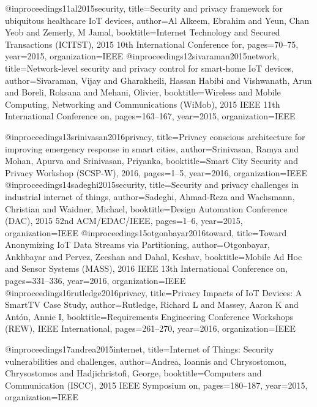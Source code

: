 {{@inproceedings{11al2015security,
	title={Security and privacy framework for ubiquitous healthcare {I}o{T} devices},
	author={Al Alkeem, Ebrahim and Yeun, Chan Yeob and Zemerly, M Jamal},
	booktitle={Internet Technology and Secured Transactions (ICITST), 2015 10th International Conference for},
	pages={70--75},
	year={2015},
	organization={IEEE}
}
@inproceedings{12sivaraman2015network,
	title={Network-level security and privacy control for smart-home {I}o{T} devices},
	author={Sivaraman, Vijay and Gharakheili, Hassan Habibi and Vishwanath, Arun and Boreli, Roksana and Mehani, Olivier},
	booktitle={Wireless and Mobile Computing, Networking and Communications (WiMob), 2015 IEEE 11th International Conference on},
	pages={163--167},
	year={2015},
	organization={IEEE}
}

@inproceedings{13srinivasan2016privacy,
	title={Privacy conscious architecture for improving emergency response in smart cities},
	author={Srinivasan, Ramya and Mohan, Apurva and Srinivasan, Priyanka},
	booktitle={Smart City Security and Privacy Workshop (SCSP-W), 2016},
	pages={1--5},
	year={2016},
	organization={IEEE}
}
@inproceedings{14sadeghi2015security,
	title={Security and privacy challenges in industrial internet of things},
	author={Sadeghi, Ahmad-Reza and Wachsmann, Christian and Waidner, Michael},
	booktitle={Design Automation Conference (DAC), 2015 52nd ACM/EDAC/IEEE},
	pages={1--6},
	year={2015},
	organization={IEEE}
}
@inproceedings{15otgonbayar2016toward,
	title={Toward Anonymizing {I}o{T} Data Streams via Partitioning},
	author={Otgonbayar, Ankhbayar and Pervez, Zeeshan and Dahal, Keshav},
	booktitle={Mobile Ad Hoc and Sensor Systems (MASS), 2016 IEEE 13th International Conference on},
	pages={331--336},
	year={2016},
	organization={IEEE}
}
@inproceedings{16rutledge2016privacy,
	title={Privacy Impacts of {I}o{T} Devices: A SmartTV Case Study},
	author={Rutledge, Richard L and Massey, Aaron K and Ant{\'o}n, Annie I},
	booktitle={Requirements Engineering Conference Workshops (REW), IEEE International},
	pages={261--270},
	year={2016},
	organization={IEEE}
}

@inproceedings{17andrea2015internet,
	title={Internet of Things: Security vulnerabilities and challenges},
	author={Andrea, Ioannis and Chrysostomou, Chrysostomos and Hadjichristofi, George},
	booktitle={Computers and Communication (ISCC), 2015 IEEE Symposium on},
	pages={180--187},
	year={2015},
	organization={IEEE}
}






























}}
